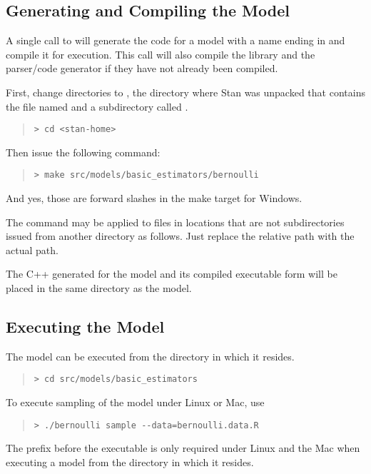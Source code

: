 \subsection{Generating and Compiling the Model}

A single call to  will generate the \Cpp code for a
model with a name ending in  and compile it for
execution.  This call will also compile the library 
and the parser/code generator  if they have not already
been compiled.

First, change directories to , the directory where
Stan was unpacked that contains the file named  and
a subdirectory called .
%
\begin{quote}
\begin{Verbatim}[fontshape=sl,fontsize=\small]
> cd <stan-home>
\end{Verbatim}
\end{quote}
%
Then issue the following command:
%
\begin{quote}
\begin{Verbatim}[fontshape=sl,fontsize=\small]
> make src/models/basic_estimators/bernoulli 
\end{Verbatim}
\end{quote}
And yes, those are forward slashes in the make target for Windows.

The  command may be applied to files in locations
that are not subdirectories issued from another directory as follows.
Just replace the relative path  with the
actual path.

The C++ generated for the model and its compiled executable
form will be placed in the same directory as the model.


\subsection{Executing the Model}

The model can be executed from the directory in which it resides.
%
\begin{quote}
\begin{Verbatim}[fontshape=sl,fontsize=\small]
> cd src/models/basic_estimators 
\end{Verbatim}
\end{quote}
%
To execute sampling of the model under Linux or Mac, use
%
\begin{quote}
\begin{Verbatim}[fontshape=sl,fontsize=\small]
> ./bernoulli sample --data=bernoulli.data.R
\end{Verbatim}
\end{quote}
%
The  prefix before the executable is only required under
Linux and the Mac when executing a model from the directory in which
it resides.


